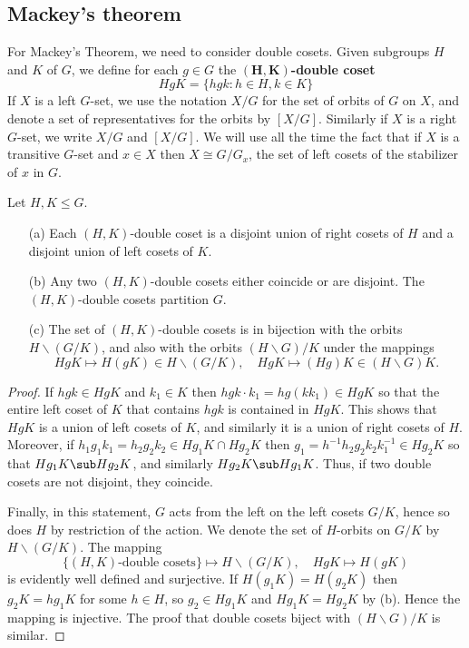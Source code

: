 \subsection{Mackey's theorem}
For Mackey's Theorem, we need to consider double cosets. Given subgroups $H$ and $K$ of $G$, we define for each $g\in G$ the \textbf{$\bm{(H,K)}$-double coset}
\[HgK=\{hgk:h\in H,k\in K\}\]
If $X$ is a left $G$-set, we use the notation $X/G$ for the set of orbits of $G$ on $X$, and denote a set of representatives for the orbits by $[X/G]$. Similarly if $X$ is a right $G$-set, we write $X/G$ and $[X/G]$. We will use all the time the fact that if $X$ is a transitive $G$-set and $x\in X$ then $X\cong G/G_x$, the set of left cosets of the stabilizer of $x$ in $G$.
\begin{proposition}\label{double coset as orbit space}
Let $H,K\leq G$.
\begin{itemize}
\item[(a)] Each $(H,K)$-double coset is a disjoint union of right cosets of $H$ and a disjoint union of left cosets of $K$.
\item[(b)] Any two $(H,K)$-double cosets either coincide or are disjoint. The $(H,K)$-double cosets partition $G$.
\item[(c)] The set of $(H,K)$-double cosets is in bijection with the orbits $H\backslash(G/K)$, and also with the orbits $(H\backslash G)/K$ under the mappings
\[HgK\mapsto H(gK)\in H\backslash(G/K),\quad HgK\mapsto(Hg)K\in(H\backslash G)K.\] 
\end{itemize}
\end{proposition}
\begin{proof}
If $hgk\in HgK$ and $k_1\in K$ then $hgk\cdot k_1=hg(kk_1)\in HgK$ so that the entire left coset of $K$ that contains $hgk$ is contained in $HgK$. This shows that $HgK$ is a union of left cosets of $K$, and similarly it is a union of right cosets of $H$. Moreover, if $h_1g_1k_1=h_2g_2k_2\in Hg_1K\cap Hg_2K$ then $g_1=h^{-1}h_2g_2k_2k_1^{-1}\in Hg_2K$ so that $Hg_1K\sub Hg_2K$, and similarly $Hg_2K\sub Hg_1K$. Thus, if two double
cosets are not disjoint, they coincide.\par
Finally, in this statement, $G$ acts from the left on the left cosets $G/K$, hence so does $H$ by restriction of the action. We denote the set of $H$-orbits on $G/K$ by $H\backslash(G/K)$. The mapping
\[\{\text{$(H,K)$-double cosets}\}\mapsto H\backslash(G/K),\quad HgK\mapsto H(gK)\]
is evidently well defined and surjective. If $H(g_1K)=H(g_2K)$ then $g_2K=hg_1K$ for some $h\in H$, so $g_2\in Hg_1K$ and $Hg_1K=Hg_2K$ by (b). Hence the mapping is injective. The proof that double cosets biject with $(H\backslash G)/K$ is similar.
\end{proof}
